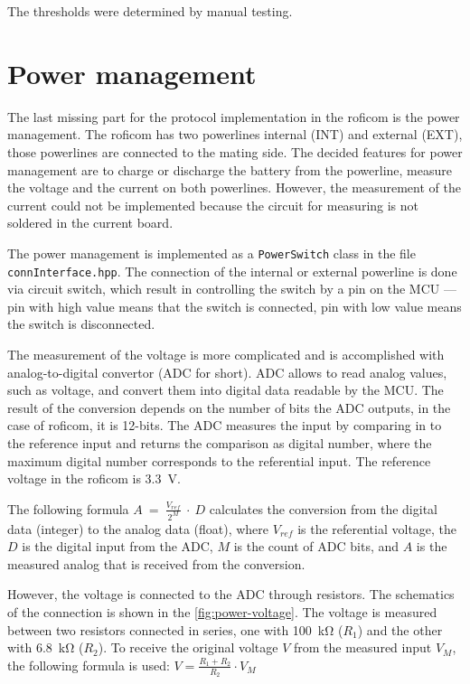 \documentclass[
  digital,     %
  oneside,     %
  nosansbold,  %
  nocolorbold, %
  nolof,         %
  nolot,         %
]{fithesis4}
\begin{document}
{{{The thresholds were determined by manual testing.

\section{ Power management }

The last missing part for the protocol implementation in the \acrshort{roficom} is the power management. The \acrshort{roficom} has two powerlines internal (INT) and external (EXT), those powerlines are connected to the mating side. The decided features for power management are to charge or discharge the battery from the powerline, measure the voltage and the current on both powerlines. However, the measurement of the current could not be implemented because the circuit for measuring is not soldered in the current board.

The power management is implemented as a \lstinline|PowerSwitch| class in the file \lstinline|connInterface.hpp|. The connection of the internal or external powerline is done via circuit switch, which result in controlling the switch by a pin on the MCU --- pin with high value means that the switch is connected, pin with low value means the switch is disconnected.

The measurement of the voltage is more complicated and is accomplished with analog-to-digital convertor (ADC for short). ADC allows to read analog values, such as voltage, and convert them into digital data readable by the MCU. The result of the conversion depends on the number of bits the ADC outputs, in the case of \acrshort{roficom}, it is 12-bits. The ADC measures the input by comparing in to the reference input and returns the comparison as digital number, where the maximum digital number corresponds to the referential input. The reference voltage in the \acrshort{roficom} is \qty{3.3}{\volt}.

The following formula $A~=~\frac{V_{ref}}{2^{M}}~\cdot~D$ calculates the conversion from the digital data (integer) to the analog data (float), where $V_{ref}$ is the referential voltage, the $D$ is the digital input from the ADC, $M$ is the count of ADC bits, and $A$ is the measured analog that is received from the conversion.

However, the voltage is connected to the ADC through resistors. The schematics of the connection is shown in the \autoref{fig:power-voltage}. The voltage is measured between two resistors connected in series, one with \qty{100}{\kilo\ohm} ($R_1$) and the other with \qty{6.8}{\kilo\ohm} ($R_2$). To receive the original voltage $V$ from the measured input $V_M$, the following formula is used: $V = \frac{R_1 + R_2}{R_2} \cdot V_{M}$

}}}
\end{document}
